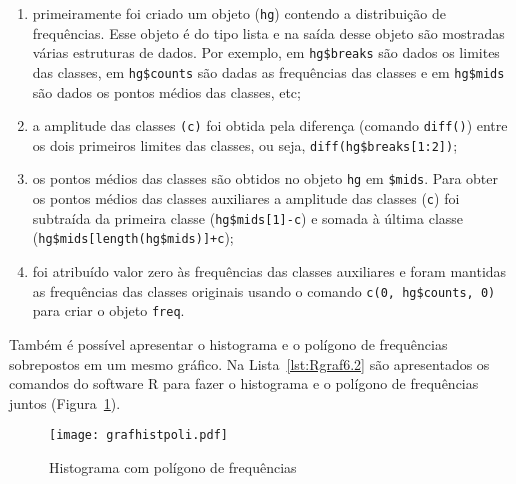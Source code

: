 \documentclass[11pt,fleqn]{book} %
\begin{document}
\begin{enumerate}[label=\alph*)]

\item primeiramente foi criado um objeto (\texttt{hg}) contendo a distribuição de frequências. Esse objeto é do tipo lista e na saída desse objeto são mostradas várias estruturas de dados. Por exemplo, em \texttt{hg\$breaks} são dados os limites das classes, em \texttt{hg\$counts} são dadas as frequências das classes e em \texttt{hg\$mids} são dados os pontos médios das classes, etc;

\item a amplitude das classes \texttt{(c)} foi obtida pela diferença (comando \texttt{diff()}) entre os dois primeiros limites das classes, ou seja, \texttt{diff(hg\$breaks[1:2])};

\item os pontos médios das classes são obtidos no objeto \texttt{hg} em \texttt{\$mids}. Para obter os pontos médios das classes auxiliares a amplitude das classes (\texttt{c}) foi subtraída da primeira classe (\texttt{hg\$mids[1]-c}) e somada à última classe (\texttt{hg\$mids[length(hg\$mids)]+c});

\item foi atribuído valor zero às frequências das classes auxiliares e foram mantidas as frequências das classes originais usando o comando \texttt{c(0, hg\$counts, 0)} para criar o objeto \texttt{freq}. \\

\end{enumerate}


Também é possível apresentar o histograma e o polígono de frequências sobrepostos em um mesmo gráfico. Na Lista~\ref{lst:Rgraf6.2} são apresentados os comandos do software R para fazer o histograma e o polígono de frequências juntos (Figura~\ref{fig:grafhistpoli}).  \\

\begin{figure}[h!]
\centering\texttt{[image: grafhistpoli.pdf]}
\setlength{\abovecaptionskip}{0.5pt}
\caption{Histograma com polígono de frequências}
\label{fig:grafhistpoli} %
\end{figure}
\end{document}
